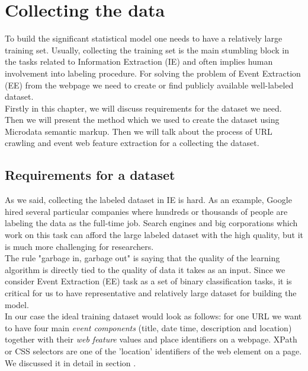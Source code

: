 \chapter{Collecting the data}
\label{chap:datacollect}
To build the significant statistical model one needs to have a relatively large training set. Usually, collecting the training set is the main stumbling block in the tasks related to Information Extraction (IE) and often implies human involvement into labeling procedure. For solving the problem of Event Extraction (EE) from the webpage we need to create or find publicly available well-labeled dataset.\\

Firstly in this chapter, we will discuss requirements for the dataset we need. Then we will present the method which we used to create the dataset using Microdata semantic markup. Then we will talk about the process of URL crawling and event web feature extraction for a collecting the dataset.

\section{Requirements for a dataset}

As we said, collecting the labeled dataset in IE is hard. As an example, Google hired several particular companies where hundreds or thousands of people are labeling the data as the full-time job\cite{GoogleRaters}. Search engines and big corporations which work on this task can afford the large labeled dataset with the high quality, but it is much more challenging for researchers. \\

The rule "garbage in, garbage out" is saying that the quality of the learning algorithm is directly tied to the quality of data it takes as an input. Since we consider Event Extraction (EE) task as a set of binary classification tasks, it is critical for us to have representative and relatively large dataset for building the model.\\

In our case the ideal training dataset would look as follows: for one URL we want to have four main \textit{event components} (title, date time, description and location) together with their \textit{web feature} values and place identifiers on a webpage. XPath or CSS selectors are one of the 'location' identifiers of the web element on a page. We discussed it in detail in section .\\

